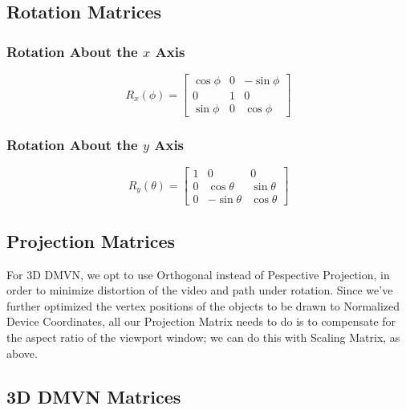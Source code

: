 \subsection{Rotation Matrices}

\subsubsection{Rotation About the $x$ Axis}
\begin{equation}
R_x(\phi) =
\begin{bmatrix}
    \cos\phi & 0 & -\sin\phi \\
    0 & 1 & 0 \\
    \sin\phi & 0 & \cos\phi
\end{bmatrix}
\end{equation}

\subsubsection{Rotation About the $y$ Axis}
\begin{equation}
R_y(\theta) =
\begin{bmatrix}
    1 & 0 & 0 \\
    0 & \cos\theta & \sin\theta \\
    0 & -\sin\theta & \cos\theta
\end{bmatrix}
\end{equation}

\subsection{Projection Matrices}
For 3D DMVN, we opt to use Orthogonal instead of Pespective Projection, in order to minimize distortion of the video and path under rotation. Since we've further optimized the vertex positions of the objects to be drawn to Normalized Device Coordinates, all our Projection Matrix needs to do is to compensate for the aspect ratio of the viewport window; we can do this with Scaling Matrix, as above.

\subsection{3D DMVN Matrices}

